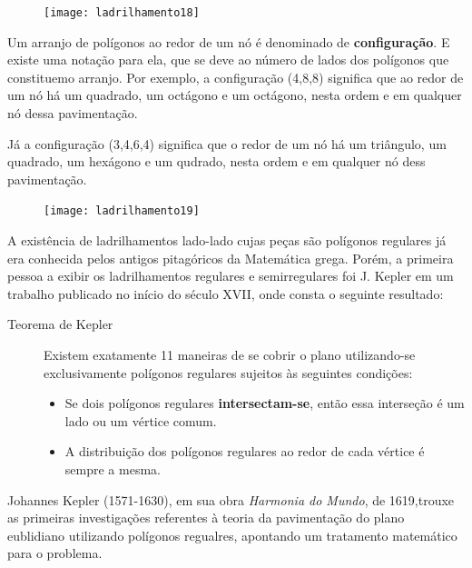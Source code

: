 \begin{figure}[H]
\centering
\texttt{[image: ladrilhamento18]}
\end{figure}

Um arranjo de polígonos ao redor de um nó é denominado de \textbf{configuração}. E existe uma notação para ela, que se deve ao número de lados dos polígonos que constituemo arranjo. Por exemplo, a configuração (4,8,8) significa que ao redor de um nó há um quadrado, um octágono e um octágono, nesta ordem e em qualquer nó dessa pavimentação.

Já a configuração (3,4,6,4) significa que o redor de um nó há um triângulo, um quadrado, um hexágono e um qudrado, nesta ordem e em qualquer nó dess pavimentação.

\begin{figure}[H]
\centering
\texttt{[image: ladrilhamento19]}
\end{figure}

A existência de ladrilhamentos lado-lado cujas peças são polígonos regulares já era conhecida pelos antigos pitagóricos da Matemática grega. Porém, a primeira pessoa a exibir os ladrilhamentos regulares e semirregulares foi J. Kepler em um trabalho publicado no início do século XVII, onde consta o seguinte resultado:

\begin{description}
\item [Teorema de Kepler] Existem exatamente 11 maneiras de se cobrir o plano utilizando-se exclusivamente polígonos regulares sujeitos às seguintes condições:

\begin{itemize}
	\item Se dois polígonos regulares \textbf{intersectam-se}, então essa interseção é um lado ou um vértice comum.
	\item A distribuição dos polígonos regulares ao redor de cada vértice é sempre a mesma.
\end{itemize}
\end{description}

\begin{knowledge}
Johannes Kepler (1571-1630), em sua obra \textit{Harmonia do Mundo}, de 1619,trouxe as primeiras investigações referentes à teoria da pavimentação do plano eublidiano utilizando polígonos regualres, apontando um tratamento matemático para o problema.
\end{knowledge}



